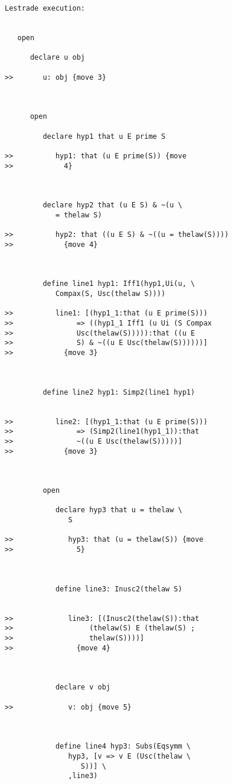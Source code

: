 \documentclass[12pt]{article}
\begin{document}
\begin{verbatim}Lestrade execution:


   open

      declare u obj

>>       u: obj {move 3}



      open

         declare hyp1 that u E prime S

>>          hyp1: that (u E prime(S)) {move
>>            4}



         declare hyp2 that (u E S) & ~(u \
            = thelaw S)

>>          hyp2: that ((u E S) & ~((u = thelaw(S))))
>>            {move 4}



         define line1 hyp1: Iff1(hyp1,Ui(u, \
            Compax(S, Usc(thelaw S))))

>>          line1: [(hyp1_1:that (u E prime(S)))
>>               => ((hyp1_1 Iff1 (u Ui (S Compax
>>               Usc(thelaw(S))))):that ((u E
>>               S) & ~((u E Usc(thelaw(S))))))]
>>            {move 3}



         define line2 hyp1: Simp2(line1 hyp1)


>>          line2: [(hyp1_1:that (u E prime(S)))
>>               => (Simp2(line1(hyp1_1)):that
>>               ~((u E Usc(thelaw(S)))))]
>>            {move 3}



         open

            declare hyp3 that u = thelaw \
               S

>>             hyp3: that (u = thelaw(S)) {move
>>               5}



            define line3: Inusc2(thelaw S)


>>             line3: [(Inusc2(thelaw(S)):that
>>                  (thelaw(S) E (thelaw(S) ;
>>                  thelaw(S))))]
>>               {move 4}



            declare v obj

>>             v: obj {move 5}



            define line4 hyp3: Subs(Eqsymm \
               hyp3, [v => v E (Usc(thelaw \
                  S))] \
               ,line3)


\end{verbatim}
\end{document}
